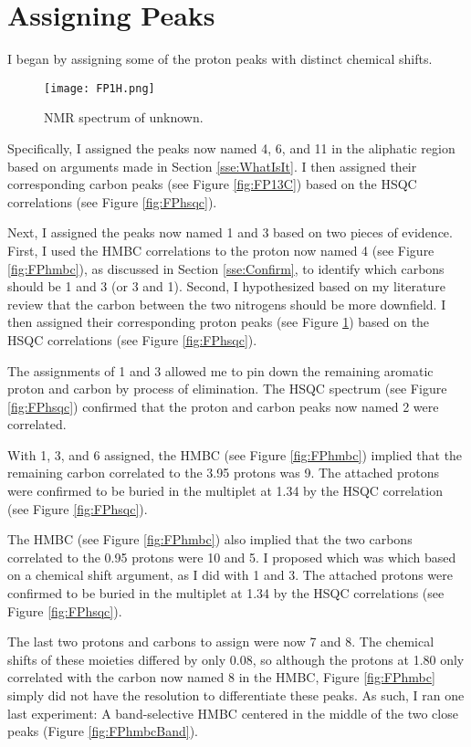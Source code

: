 \documentclass[titlepage]{article}
\begin{document}
\section{Assigning Peaks}
I began by assigning some of the proton peaks with distinct chemical shifts.
\begin{figure}[H]
    \centering
    \texttt{[image: FP1H.png]}
    \caption{ NMR spectrum of unknown.}
    \label{fig:FP1H}
\end{figure}
Specifically, I assigned the  peaks now named 4, 6, and 11 in the aliphatic region based on arguments made in Section \ref{sse:WhatIsIt}. I then assigned their corresponding carbon peaks (see Figure \ref{fig:FP13C}) based on the HSQC correlations (see Figure \ref{fig:FPhsqc}).\par
Next, I assigned the  peaks now named 1 and 3 based on two pieces of evidence. First, I used the HMBC correlations to the proton now named 4 (see Figure \ref{fig:FPhmbc}), as discussed in Section \ref{sse:Confirm}, to identify which carbons should be 1 and 3 (or 3 and 1). Second, I hypothesized based on my literature review that the carbon between the two nitrogens should be more downfield. I then assigned their corresponding proton peaks (see Figure \ref{fig:FP1H}) based on the HSQC correlations (see Figure \ref{fig:FPhsqc}).\par
The assignments of 1 and 3 allowed me to pin down the remaining aromatic proton and carbon by process of elimination. The HSQC spectrum (see Figure \ref{fig:FPhsqc}) confirmed that the proton and carbon peaks now named 2 were correlated.\par
With 1, 3, and 6 assigned, the HMBC (see Figure \ref{fig:FPhmbc}) implied that the remaining carbon correlated to the \SI{3.95}{\partspermillion} protons was 9. The attached protons were confirmed to be buried in the multiplet at \SI{1.34}{\partspermillion} by the HSQC correlation (see Figure \ref{fig:FPhsqc}).\par
The HMBC (see Figure \ref{fig:FPhmbc}) also implied that the two carbons correlated to the \SI{0.95}{\partspermillion} protons were 10 and 5. I proposed which was which based on a chemical shift argument, as I did with 1 and 3. The attached protons were confirmed to be buried in the multiplet at \SI{1.34}{\partspermillion} by the HSQC correlations (see Figure \ref{fig:FPhsqc}).\par
The last two protons and carbons to assign were now 7 and 8. The  chemical shifts of these moieties differed by only \SI{0.08}{\partspermillion}, so although the protons at \SI{1.80}{\partspermillion} only correlated with the carbon now named 8 in the HMBC, Figure \ref{fig:FPhmbc} simply did not have the resolution to differentiate these peaks. As such, I ran one last experiment: A band-selective HMBC centered in the middle of the two close peaks (Figure \ref{fig:FPhmbcBand}).
\end{document}
